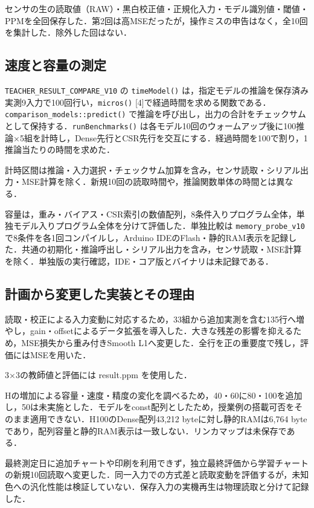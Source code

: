\documentclass[
  10pt,
  a4paper,
]{article}
\begin{document}
センサの生の読取値（RAW）・黒白校正値・正規化入力・モデル識別値・閾値・PPMを全回保存した．第2回は高MSEだったが，操作ミスの申告はなく，全10回を集計した．除外した回はない．

\subsection{速度と容量の測定}\label{ux901fux5ea6ux3068ux5bb9ux91cfux306eux6e2cux5b9a}

\texttt{TEACHER\_RESULT\_COMPARE\_V10} の \texttt{timeModel()}
は，指定モデルの推論を保存済み実測9入力で100回行い，\texttt{micros()}
{[}4{]}で経過時間を求める関数である．\texttt{comparison\_models::predict()}
で推論を呼び出し，出力の合計をチェックサムとして保持する．\texttt{runBenchmarks()}
は各モデル10回のウォームアップ後に100推論×5組を計時し，Dense先行とCSR先行を交互にする．経過時間を100で割り，1推論当たりの時間を求めた．

計時区間は推論・入力選択・チェックサム加算を含み，センサ読取・シリアル出力・MSE計算を除く．新規10回の読取時間や，推論関数単体の時間とは異なる．

容量は，重み・バイアス・CSR索引の数値配列，8条件入りプログラム全体，単独モデル入りプログラム全体を分けて評価した．単独比較は
\texttt{memory\_probe\_v10} で8条件を各1回コンパイルし，Arduino
IDEのFlash・静的RAM表示を記録した．共通の初期化・推論呼出し・シリアル出力を含み，センサ読取・MSE計算を除く．単独版の実行確認，IDE・コア版とバイナリは未記録である．

\subsection{計画から変更した実装とその理由}\label{ux8a08ux753bux304bux3089ux5909ux66f4ux3057ux305fux5b9fux88c5ux3068ux305dux306eux7406ux7531}

読取・校正による入力変動に対応するため，33組から追加実測を含む135行へ増やし，gain・offsetによるデータ拡張を導入した．大きな残差の影響を抑えるため，MSE損失から重み付きSmooth
L1へ変更した．全行を正の重要度で残し，評価にはMSEを用いた．

3×3の教師値と評価には result.ppm を使用した．

Hの増加による容量・速度・精度の変化を調べるため，40・60に80・100を追加し，50は未実施とした．モデルをconst配列としたため，授業例の搭載可否をそのまま適用できない．H100のDense配列43,212
byteに対し静的RAMは6,764
byteであり，配列容量と静的RAM表示は一致しない．リンカマップは未保存である．

最終測定日に追加チャートや印刷を利用できず，独立最終評価から学習チャートの新規10回読取へ変更した．同一入力での方式差と読取変動を評価するが，未知色への汎化性能は検証していない．保存入力の実機再生は物理読取と分けて記録した．
\end{document}
